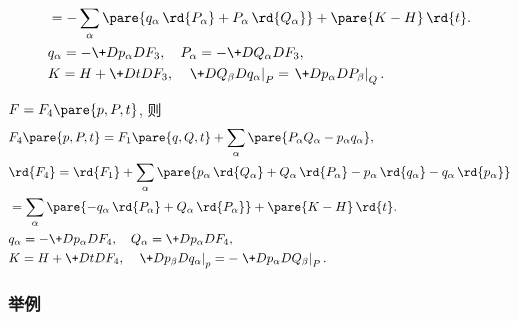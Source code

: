 \documentclass{ctexart}
\begin{document}
\begin{cenum}
\begin{align*}
        & = -\sum_\alpha \pare{q_\alpha\,\rd{P_\alpha} + P_\alpha\,\rd{Q_\alpha}} + \pare{K-H}\,\rd{t}. \\
        & q_\alpha = -\+D{p_\alpha}D{F_3},\quad P_\alpha = -\+D{Q_\alpha}D{F_3}, \\
        & K = H + \+DtD{F_3},\quad \left.\+D{Q_\beta}D{q_\alpha}\right\vert_P = \left.\+D{p_\alpha}D{P_\beta}\right\vert_Q.
    \end{align*}
    \item $F=F_4\pare{p,P,t}$, 则
    \begin{align*}
        & F_4\pare{p,P,t} = F_1\pare{q,Q,t} + \sum_\alpha\pare{P_\alpha Q_\alpha - p_\alpha q_\alpha}, \\
        & \rd{F_4} = \rd{F_1} + \sum_\alpha\pare{p_\alpha\,\rd{Q_\alpha} + Q_\alpha\,\rd{P_\alpha} - p_\alpha\,\rd{q_\alpha} - q_\alpha\,\rd{p_\alpha}} \\
        & = \sum_\alpha\pare{-q_\alpha\,\rd{P_\alpha}+ Q_\alpha\,\rd{P_\alpha}} + \pare{K-H}\,\rd{t}. \\
        & q_\alpha = -\+D{p_\alpha}D{F_4},\quad Q_\alpha = \+D{p_\alpha}D{F_4},\\
        & K = H + \+DtD{F_4},\quad \left.\+D{p_\beta}D{q_\alpha}\right\vert_p = -\left.\+D{p_\alpha}D{Q_\beta}\right\vert_P.
    \end{align*}
\end{cenum}


\subsubsection{举例} %
\label{ssub:举例}
\end{document}
